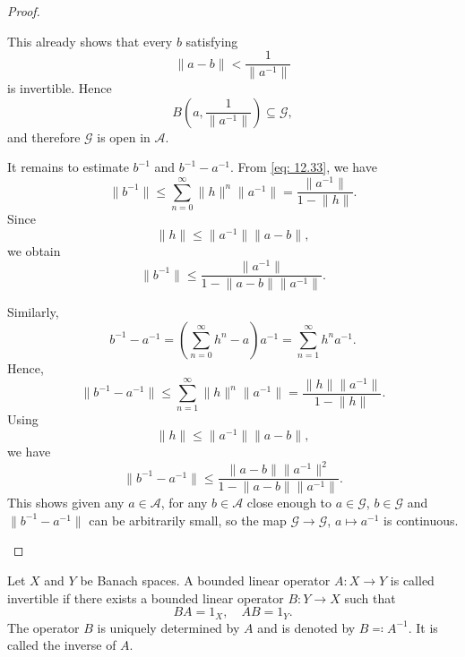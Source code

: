 \begin{proof}
\begin{enumerate}
        This already shows that every \(b\) satisfying 
        \[
            \lVert a - b \rVert < \frac{1}{\lVert a^{-1} \rVert } 
        \] 
        is invertible. Hence 
        \[
            B \left( a, \frac{1}{\lVert a^{-1} \rVert } \right) \subseteq \mathcal{G}, 
        \]
        and therefore \(\mathcal{G} \) is open in \(\mathcal{A} \). 

        It remains to estimate \(b^{-1}\) and \(b^{-1} - a^{-1}\). From \autoref{eq: 12.33}, we have 
        \[
            \lVert b^{-1} \rVert \le \sum_{n=0}^{\infty} \lVert h \rVert^n \lVert a^{-1} \rVert = \frac{\lVert a^{-1} \rVert }{1 - \lVert h \rVert }.   
        \]     
        Since 
        \[
            \lVert h \rVert \le \lVert a^{-1} \rVert \lVert a - b \rVert,
        \]
        we obtain 
        \[
            \lVert b^{-1} \rVert \le \frac{\lVert a^{-1} \rVert }{1 - \lVert a - b \rVert \lVert a^{-1} \rVert }. 
        \]

        Similarly, 
        \[
            b^{-1} - a^{-1} = \left( \sum_{n=0}^\infty h^n - a  \right) a^{-1} = \sum_{n=1}^{\infty} h^n a^{-1}.  
        \]
        Hence,
        \[
            \lVert b^{-1} - a^{-1} \rVert \le \sum_{n=1}^{\infty} \lVert h \rVert^n \lVert a^{-1} \rVert = \frac{\lVert h \rVert \lVert a^{-1} \rVert  }{1 - \lVert h \rVert }.   
        \]
        Using 
        \[
            \lVert h \rVert \le \lVert a^{-1} \rVert \lVert a - b \rVert,   
        \]
        we have 
        \[
            \lVert b^{-1} - a^{-1} \rVert \le \frac{\lVert a - b \rVert \lVert a^{-1} \rVert^2  }{1 - \lVert a - b \rVert \lVert a^{-1} \rVert  }. 
        \]
        This shows given any \(a \in \mathcal{A} \), for any \(b \in \mathcal{A} \) close enough to \(a \in \mathcal{G} \), \(b \in \mathcal{G} \) and \(\lVert b^{-1} - a^{-1} \rVert \) can be arbitrarily small, so the map \(\mathcal{G} \to \mathcal{G} \), \(a \mapsto a^{-1}\) is continuous.      
    \end{enumerate}
\end{proof}

\begin{definition}
    Let \(X\) and \(Y\) be Banach spaces. A bounded linear operator \(A : X \to Y\) is called invertible if there exists a bounded linear operator \(B: Y \to X\) such that 
    \[
        BA = 1_X, \quad AB = 1_Y.
    \]    
    The operator \(B\) is uniquely determined by \(A\) and is denoted by \(B \eqqcolon A^{-1} \). It is called the inverse of \(A\).    
\end{definition}


